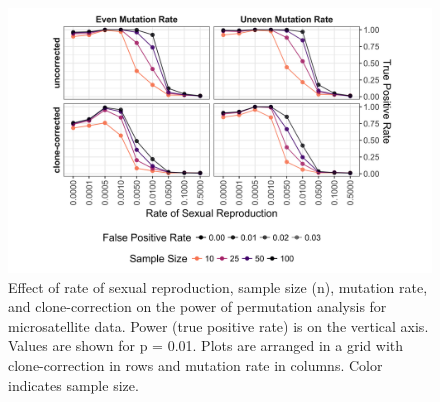 \documentclass[double,11pt]{beavtex}
\begin{document}
  \begin{figure}
  
  {\centering \includegraphics[width=1\linewidth]{figure/simulations/ssr_power} 
  
  }
  
  \caption[Effect of rate of sexual reproduction, sample size, mutation rate,
  and clone-correction on the power of permutation analysis for microsatellite
  data.]{Effect of rate of sexual reproduction, sample size (n), mutation rate,
  and clone-correction on the power of permutation analysis for microsatellite
  data. Power (true positive rate) is on the vertical axis. Values are shown for p
  = 0.01. Plots are arranged in a grid with clone-correction in rows and mutation
  rate in columns. Color indicates sample size.}\label{fig:sim4}
  \end{figure}
  
\end{document}
